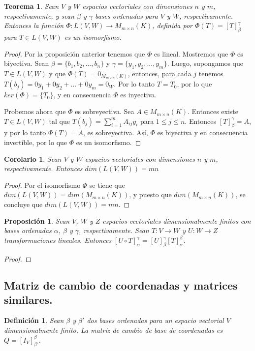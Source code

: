 \documentclass{book}
\newtheorem{theorem}{Teorema}
\newtheorem{proposition}{Proposición}
\newtheorem{definition}{Definición}
\newtheorem{corollary}{Corolario}
\begin{document}
\begin{theorem}
Sean $V$ y $W$ espacios vectoriales con dimensiones $n$ y $m$, respectivamente, y sean $\beta$ y $\gamma$ bases ordenadas para $V$ y $W$, respectivamente. Entonces la función $\Phi:L(V,W)\rightarrow M_{m\times n}(K)$, definida por $\Phi (T)=[T]_{\beta} ^{\gamma}$ para $T\in L(V,W)$ es un isomorfismo.
\end{theorem}

\begin{proof}
Por la proposición anterior tenemos que $\Phi$ es lineal. Mostremos que $\Phi$ es biyectiva. Sean $\beta=\{b_1,b_2,...,b_n\}$ y $\gamma=\{y_1,y_2,...,y_m\}$. Luego, supongamos que $T\in L(V,W)$ y que $\Phi (T)=0_{M_{m\times n}(K)}$, entonces, para cada $j$ tenemos $T(b_j)=0y_1+0y_2+...+0y_m=0_W$. Por lo tanto $T=T_0$, por lo que $ker(\Phi)=\{T_0\}$, y en consecuencia $\Phi$ es inyectiva. 

Probemos ahora que $\Phi$ es sobreyectiva. 	Sea $A\in M_{m\times n}(K)$. Entonces existe $T\in L(V,W)$ tal que $T(b_j)=\sum_{i=1}^{m}A_{ij}y_{i}$ para $1\leq j\leq n$. Entonces $[T]_{\beta} ^{\gamma}=A$, y por lo tanto $\Phi(T)=A$, es sobreyectiva. Así, $\Phi$ es biyectiva y en consecuencia invertible, por lo que $\Phi$ es un isomorfismo.
\end{proof}

\begin{corollary}
Sean $V$ y $W$ espacios vectoriales con dimensiones $n$ y $m$, respectivamente. Entonces $dim(L(V,W))=mn$ 
\end{corollary}

\begin{proof}
Por el isomorfismo $\Phi$ se tiene que $dim(L(V,W))=dim(M_{m\times n}(K))$, y puesto que $dim(M_{m\times n}(K))$, se concluye que $dim(L(V,W))=mn$.
\end{proof}

\begin{proposition}
Sean $V$, $W$ y $Z$ espacios vectoriales dimensionalmente finitos con bases ordenadas $\alpha$, $\beta$ y $\gamma$, respectivamente. Sean $T:V \rightarrow W$ y $U:W \rightarrow Z$ transformaciones lineales. Entonces $[U\circ T]_{\alpha} ^{\gamma}=[U]_{\beta} ^{\gamma} [T]_{\alpha} ^{\beta}$.
\end{proposition}

\begin{proof}

\end{proof}

\subsection{Matriz de cambio de coordenadas y matrices similares.}
\begin{definition}
Sean $\beta$ y $\beta '$ dos bases ordenadas para un espacio vectorial $V$ dimensionalmente finito. La matriz de cambio de base de coordenadas es $Q=[I_V]_{\beta '} ^{\beta}$.
\end{definition}
\end{document}
